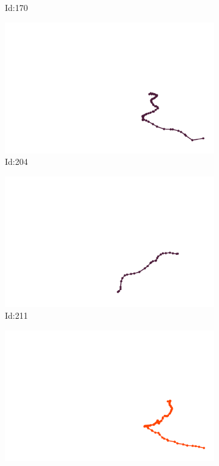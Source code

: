 \documentclass[12pt,twoside]{report}
\begin{document}
\begin{figure}
\begin{subfigure}[b]{0.20\textwidth}
\caption{Id:170}
\end{subfigure}
\begin{subfigure}[b]{0.20\textwidth}
\centering
\includegraphics[width=\textwidth]{../trajectories/204.png}
\caption{Id:204}
\end{subfigure}
\begin{subfigure}[b]{0.20\textwidth}
\centering
\includegraphics[width=\textwidth]{../trajectories/211.png}
\caption{Id:211}
\end{subfigure}
\begin{subfigure}[b]{0.20\textwidth}
\centering
\includegraphics[width=\textwidth]{../trajectories/216.png}

\end{subfigure}
\end{figure}
\end{document}
